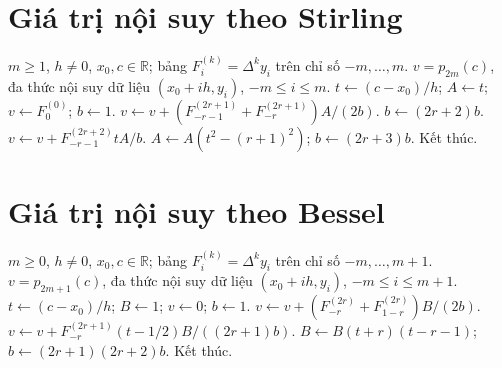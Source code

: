 \documentclass[12pt,a4paper,oneside]{book}
\numberwithin{algorithm}{chapter}
\theoremstyle{definition}
\newcommand{\R}{\mathbb{R}}
\begin{document}
\section{Giá trị nội suy theo Stirling}
\begin{algorithm}[H]
\caption{Tính giá trị theo công thức Stirling}
\label{alg:central-stirling}
\begin{algorithmic}[1]
\Require $m\geq1$, $h\ne0$, $x_0,c\in\R$; bảng $F_i^{(k)}=\Delta^ky_i$ trên chỉ số $-m,\ldots,m$.
\Ensure $v=p_{2m}(c)$, đa thức nội suy dữ liệu $(x_0+ih,y_i)$, $-m\leq i\leq m$.
\State $t\gets(c-x_0)/h$; $A\gets t$; $v\gets F_0^{(0)}$; $b\gets1$.
 \State $v\gets v+(F_{-r-1}^{(2r+1)}+F_{-r}^{(2r+1)})A/(2b)$.
 \State $b\gets(2r+2)b$.
 \State $v\gets v+F_{-r-1}^{(2r+2)}tA/b$.
 \State $A\gets A(t^2-(r+1)^2)$; $b\gets(2r+3)b$.
\EndFor
\Statex
\State Kết thúc.
\end{algorithmic}
\end{algorithm}

\section{Giá trị nội suy theo Bessel}
\begin{algorithm}[H]
\caption{Tính giá trị theo công thức Bessel}
\label{alg:central-bessel}
\begin{algorithmic}[1]
\Require $m\geq0$, $h\ne0$, $x_0,c\in\R$; bảng $F_i^{(k)}=\Delta^ky_i$ trên chỉ số $-m,\ldots,m+1$.
\Ensure $v=p_{2m+1}(c)$, đa thức nội suy dữ liệu $(x_0+ih,y_i)$, $-m\leq i\leq m+1$.
\State $t\gets(c-x_0)/h$; $B\gets1$; $v\gets0$; $b\gets1$.
 \State $v\gets v+(F_{-r}^{(2r)}+F_{1-r}^{(2r)})B/(2b)$.
 \State $v\gets v+F_{-r}^{(2r+1)}(t-1/2)B/((2r+1)b)$.
 \State $B\gets B(t+r)(t-r-1)$; $b\gets(2r+1)(2r+2)b$.
\EndFor
\Statex
\State Kết thúc.
\end{algorithmic}
\end{algorithm}

\end{document}
